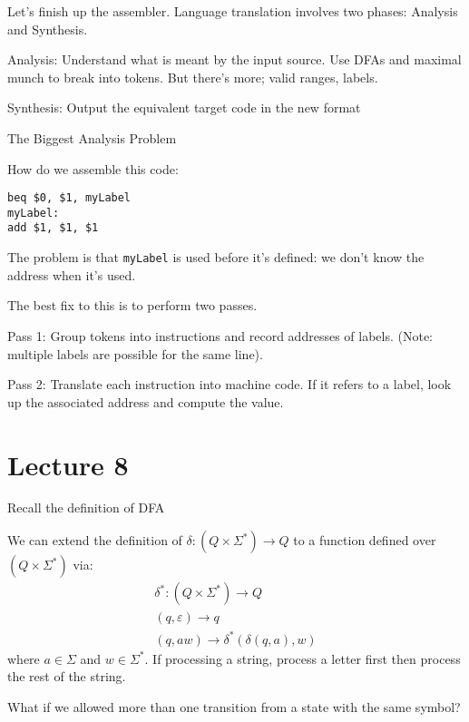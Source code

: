 \documentclass{article}
\begin{document}
Let's finish up the assembler. Language translation involves two phases:
Analysis and Synthesis.

Analysis: Understand what is meant by the input source. Use DFAs and
maximal munch to break into tokens. But there's more; valid ranges,
labels.

Synthesis: Output the equivalent target code in the new format

The Biggest Analysis Problem

How do we assemble this code:
\begin{tcolorbox}
\begin{verbatim}
beq $0, $1, myLabel
myLabel:
add $1, $1, $1
\end{verbatim}
\end{tcolorbox}


The problem is that \texttt{myLabel} is used before it's defined: we
don't know the address when it's used.

The best fix to this is to perform two passes.

Pass 1: Group tokens into instructions and record addresses of labels.
(Note: multiple labels are possible for the same line).

Pass 2: Translate each instruction into machine code. If it refers to a
label, look up the associated address and compute the value.

\section{Lecture 8}\label{lecture-8}

Recall the definition of DFA

We can extend the definition of \(\delta: (Q \times \Sigma^*) \to Q\) to
a function defined over \((Q \times \Sigma^*)\) via:
\begin{align*}
\delta^* : ( Q \times \Sigma^*) \to Q \\
(q, \varepsilon) \to q \\
(q, aw) \to \delta^*(\delta(q,a),w)
\end{align*}
where \(a \in \Sigma\) and \(w \in \Sigma^*\). If processing a
string, process a letter first then process the rest of the string.


What if we allowed more than one transition from a state with the same
symbol?
\end{document}
